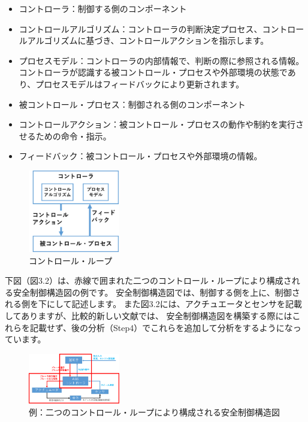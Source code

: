 \begin{itemize}
    \item コントローラ：制御する側のコンポーネント
    \item コントロールアルゴリズム：コントローラの判断決定プロセス、コントロールアルゴリズムに基づき、コントロールアクションを指示します。
    \item プロセスモデル：コントローラの内部情報で、判断の際に参照される情報。コントローラが認識する被コントロール・プロセスや外部環境の状態であり、プロセスモデルはフィードバックにより更新されます。
    \item 被コントロール・プロセス：制御される側のコンポーネント
    \item コントロールアクション：被コントロール・プロセスの動作や制約を実行させるための命令・指示。
    \item フィードバック：被コントロール・プロセスや外部環境の情報。
\end{itemize}

\begin{figure}[H]
    \centering
    \includegraphics[width=40mm]{safety_assurance_contents/ch3images/fig-3-2-3-01.png}
    \caption[short]{コントロール・ループ}
\end{figure}

下図（図3.2）は、赤線で囲まれた二つのコントロール・ループにより構成される安全制御構造図の例です。
安全制御構造図では、制御する側を上に、制御される側を下にして記述します。
また図3.2には、アクチュエータとセンサを記載してありますが、比較的新しい文献では、
安全制御構造図を構築する際にはこれらを記載せず、後の分析（Step4）でこれらを追加して分析をするようになっています。

\begin{figure}[H]
    \centering
    \includegraphics[width=40mm]{safety_assurance_contents/ch3images/fig-3-2-3-02.png}
    \caption[short]{例：二つのコントロール・ループにより構成される安全制御構造図}
\end{figure}

